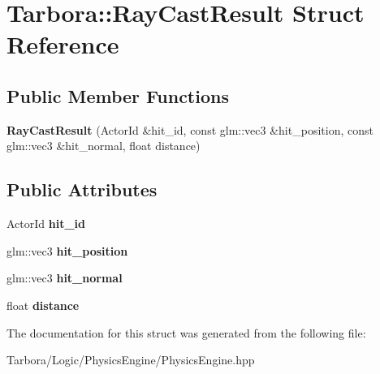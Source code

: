 \hypertarget{structTarbora_1_1RayCastResult}{}\section{Tarbora\+:\+:Ray\+Cast\+Result Struct Reference}
\label{structTarbora_1_1RayCastResult}
\subsection*{Public Member Functions}
\begin{DoxyCompactItemize}
\item 
\mbox{\label{structTarbora_1_1RayCastResult_a81b9928f8fc624b530c2cf5ceab102c9}} 
{\bfseries Ray\+Cast\+Result} (Actor\+Id \&hit\+\_\+id, const glm\+::vec3 \&hit\+\_\+position, const glm\+::vec3 \&hit\+\_\+normal, float distance)
\end{DoxyCompactItemize}
\subsection*{Public Attributes}
\begin{DoxyCompactItemize}
\item 
\mbox{\label{structTarbora_1_1RayCastResult_acd2243bebee0cc55bfd8751264da3404}} 
Actor\+Id {\bfseries hit\+\_\+id}
\item 
\mbox{\label{structTarbora_1_1RayCastResult_aef0bd4f64c55de3ac7b8bf2a4aa6e80f}} 
glm\+::vec3 {\bfseries hit\+\_\+position}
\item 
\mbox{\label{structTarbora_1_1RayCastResult_afa5c03785dae1df17095e367f326c0ff}} 
glm\+::vec3 {\bfseries hit\+\_\+normal}
\item 
\mbox{\label{structTarbora_1_1RayCastResult_a5ee7197ea2aa28d9b59401f5300466fe}} 
float {\bfseries distance}
\end{DoxyCompactItemize}


The documentation for this struct was generated from the following file\+:\begin{DoxyCompactItemize}
\item 
Tarbora/\+Logic/\+Physics\+Engine/Physics\+Engine.\+hpp\end{DoxyCompactItemize}
